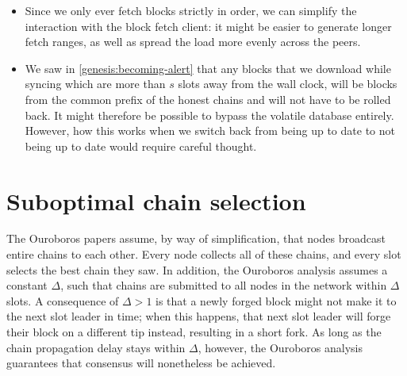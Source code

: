 \begin{itemize}
\item Since we only ever fetch blocks strictly in order, we can simplify
the interaction with the block fetch client: it might be easier to generate
longer fetch ranges, as well as spread the load more evenly across the peers.

\item We saw in \cref{genesis:becoming-alert} that any blocks that we download
while syncing which are more than $s$ slots away from the wall clock, will be
blocks from the common prefix of the honest chains and will not have to be
rolled back. It might therefore be possible to bypass the volatile database
entirely. However, how this works when we switch back from being up to date
to not being up to date would require careful thought.

\end{itemize}

\section{Suboptimal chain selection}

The Ouroboros papers assume, by way of simplification, that nodes broadcast
entire chains to each other. Every node collects all of these chains, and
every slot selects the best chain they saw. In addition, the Ouroboros analysis
assumes a constant $\Delta$, such that chains are submitted to all nodes in
the network within $\Delta$ slots. A consequence of $\Delta > 1$ is that
a newly forged block might not make it to the next slot leader in time; when
this happens, that next slot leader will forge their block on a different tip
instead, resulting in a short fork. As long as the chain propagation delay
stays within $\Delta$, however, the Ouroboros analysis guarantees that
consensus will nonetheless be achieved.

